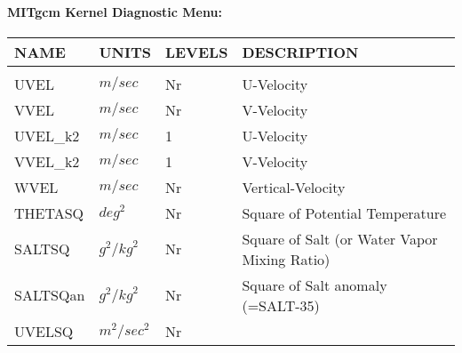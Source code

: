 \newpage
\paragraph{MITgcm Kernel Diagnostic Menu:}
\label{sec:diagnostics:menu}

\begin{table}
\begin{tabular}{llll}
\hline\hline
 NAME & UNITS & LEVELS & DESCRIPTION \\
\hline

&\\
 UVEL     & $m/sec$ & Nr
         &\begin{minipage}[t]{3in}
          {U-Velocity} 
         \end{minipage}\\
 VVEL     & $m/sec$ & Nr
         &\begin{minipage}[t]{3in}
          {V-Velocity} 
         \end{minipage}\\
 UVEL\_k2  & $m/sec$ & 1
         &\begin{minipage}[t]{3in}
          {U-Velocity} 
         \end{minipage}\\
 VVEL\_k2  & $m/sec$ & 1
         &\begin{minipage}[t]{3in}
          {V-Velocity} 
         \end{minipage}\\
 WVEL     & $m/sec$ & Nr
         &\begin{minipage}[t]{3in}
          {Vertical-Velocity} 
         \end{minipage}\\
 THETASQ  & $deg^2$ & Nr
         &\begin{minipage}[t]{3in}
          {Square of Potential Temperature} 
         \end{minipage}\\
 SALTSQ   & $g^2/{kg}^2$ & Nr
         &\begin{minipage}[t]{3in}
          {Square of Salt (or Water Vapor Mixing Ratio)} 
         \end{minipage}\\
 SALTSQan & $g^2/{kg}^2$ & Nr
         &\begin{minipage}[t]{3in}
          {Square of Salt anomaly (=SALT-35)} 
         \end{minipage}\\
 UVELSQ   & $m^2/sec^2$ & Nr

\end{tabular}
\end{table}
